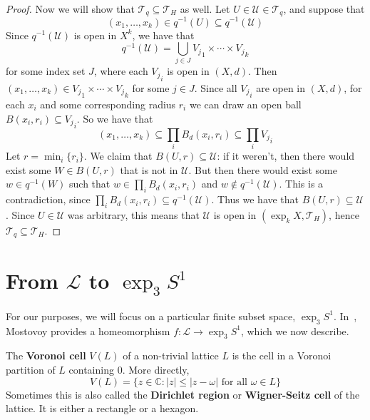 \documentclass[12pt,twoside]{reedthesis}
\theoremstyle{definition}
\newcommand{\C}{\mathbb{C}}
\newcommand{\LS}{\mathcal{L}}
\newcommand{\defnphrase}[1]{\textbf{#1}}
\begin{document}
\begin{proof}
  Now we will show that $\mathcal{T}_q \subseteq \mathcal{T}_H$ as well.
  Let $U \in \mathcal{U} \in \mathcal{T}_q$, and suppose that
  \begin{equation*}
    (x_1, \ldots, x_k) \in q^{-1}(U) \subseteq q^{-1}(\mathcal{U})
  \end{equation*}
  Since $q^{-1}(\mathcal{U})$ is open in $X^k$, we have that 
  \begin{equation*}
    q^{-1}(\mathcal{U}) = \bigcup_{j \in J} {V_j}_1 \times \cdots \times {V_j}_k
  \end{equation*}
  for some index set $J$, where each ${V_j}_i$ is open in $(X,d)$.
  Then $(x_1, \ldots, x_k) \in {V_j}_1 \times \cdots \times {V_j}_k$ for some $j \in J$.
  Since all ${V_j}_i$ are open in $(X,d)$, for each $x_i$ and some corresponding radius $r_i$ we can draw an open ball $B(x_i, r_i) \subseteq {V_j}_i$.
  So we have that
  \begin{equation*}
    (x_1, \ldots, x_k) \subseteq \prod_i B_d(x_i, r_i) \subseteq \prod_i {V_j}_i
  \end{equation*}
  Let $r = \min_i \{ r_i \}$.
  We claim that $B(U, r) \subseteq \mathcal{U}$: if it weren't, then there would exist some $W \in B(U, r)$ that is not in $\mathcal{U}$.
  But then there would exist some $w \in q^{-1}(W)$ such that $w \in \prod_i B_d(x_i, r_i)$ and $w \notin q^{-1}(\mathcal{U})$.
  This is a contradiction, since $\prod_i B_d(x_i, r_i) \subseteq q^{-1}(\mathcal{U})$.
  Thus we have that $B(U, r) \subseteq \mathcal{U}$.
  Since $U \in \mathcal{U}$ was arbitrary, this means that $\mathcal{U}$ is open in $(\exp_k X, \mathcal{T}_H)$, hence $\mathcal{T}_q \subseteq \mathcal{T}_H$.
\end{proof}

\section{From $\LS$ to $\exp_3 S^1$}\label{subsec:lattice_to_exp}

For our purposes, we will focus on a particular finite subset space, $\exp_3 S^1$.
In~\cite{mostovoy2004}, Mostovoy provides a homeomorphism $f : \LS \to \exp_3 S^1$, which we now describe.

The \defnphrase{Voronoi cell} $V(L)$ of a non-trivial lattice $L$ is the cell in a Voronoi partition of $L$ containing $0$.
More directly,
\begin{equation*}
  V(L) = \{ z \in \C : |z| \leq |z - \omega| \text{ for all } \omega \in L \}
\end{equation*}
Sometimes this is also called the \defnphrase{Dirichlet region} or \defnphrase{Wigner-Seitz cell} of the lattice.
It is either a rectangle or a hexagon.
\end{document}
